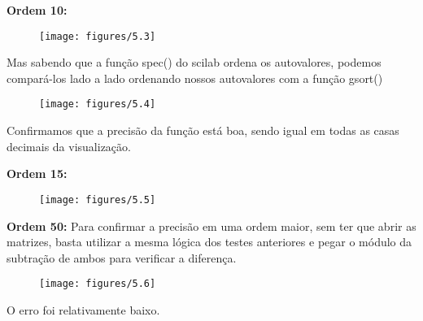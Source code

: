\documentclass[leqno]{article}
\numberwithin{equation}{section}
\begin{document}
	\textbf{{\large Ordem 10:}}
	
	\begin{figure}[H]
		\centering
		\texttt{[image: figures/5.3]}		
	\end{figure}
	
	Mas sabendo que a função spec() do scilab ordena os autovalores, podemos compará-los lado a lado ordenando nossos autovalores com a função gsort()
	
	\begin{figure}[H]
		\centering
		\texttt{[image: figures/5.4]}		
	\end{figure}

	Confirmamos que a precisão da função está boa, sendo igual em todas as casas decimais da visualização.	
	
	\textbf{{\large Ordem 15:}}
	
	\begin{figure}[H]
		\centering
		\texttt{[image: figures/5.5]}		
	\end{figure}

	\textbf{{\large Ordem 50:}}
	Para confirmar a precisão em uma ordem maior, sem ter que abrir as matrizes, basta utilizar a mesma lógica dos testes anteriores e pegar o módulo da subtração de ambos para verificar a diferença.
	
	\begin{figure}[H]
		\centering
		\texttt{[image: figures/5.6]}		
	\end{figure}

	O erro foi relativamente baixo.
\end{document}
